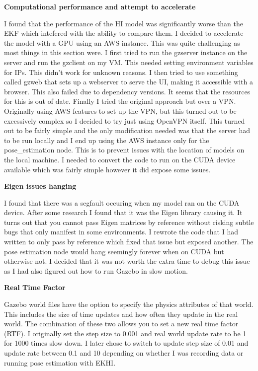\documentclass[]{../resources/final_report}
\begin{document}
\pagebreak

\textbf{Computational performance and attempt to accelerate}

I found that the performance of the HI model was significantly worse than the EKF which intefered with the ability to compare them. I decided to accelerate the model with a GPU using an AWS instance. This was quite challenging as most things in this section were. I first tried to run the gzserver instance on the server and run the gzclient on my VM. This needed setting environment variables for IPs. This didn't work for unknown reasons.
I then tried to use something called gzweb that sets up a webserver to serve the UI, making it accessible with a browser. This also failed due to dependency versions. It seems that the resources for this is out of date. Finally I tried the original approach but over a VPN. Originally using AWS features to set up the VPN, but this turned out to be excessively complex so I decided to try just using OpenVPN itself. This turned out to be fairly simple and the only modification needed was that the server had to be run locally and I end up using the AWS instance only for the pose\_estimation node. This is to prevent issues with the location of models on the local machine. I needed to convert the code to run on the CUDA device available which was fairly simple however it did expose some issues.

\textbf{Eigen issues hanging}

I found that there was a segfault occuring when my model ran on the CUDA device. After some research I found that it was the Eigen library causing it. It turns out that you cannot pass Eigen matrices by reference without risking subtle bugs that only manifest in some environments. I rewrote the code that I had written to only pass by reference which fixed that issue but exposed another. The pose estimation node would hang seemingly forever when on CUDA but otherwise not. I decided that it was not worth the extra time to debug this issue as I had also figured out how to run Gazebo in slow motion. 

\textbf{Real Time Factor}

Gazebo world files have the option to specify the physics attributes of that world. This includes the size of time updates and how often they update in the real world. The combination of these two allows you to set a new real time factor (RTF). I originally set the step size to 0.001 and real world update rate to be 1 for 1000 times slow down. I later chose to switch to update step size of 0.01 and update rate between 0.1 and 10 depending on whether I was recording data or running pose estimation with EKHI.
\end{document}
